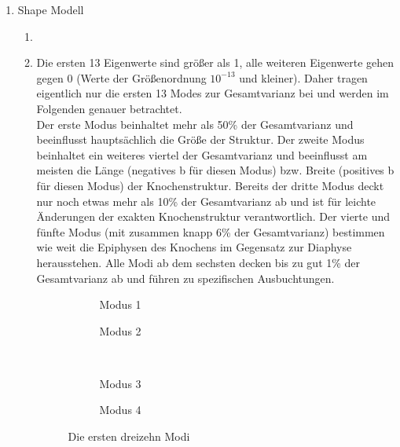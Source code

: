 \documentclass[]{report}
\newlength\figureheight
\newlength\figurewidth
\begin{document}
\begin{enumerate}
	\item Shape Modell
	\begin{enumerate}
		\item
		\item %
		Die ersten 13 Eigenwerte sind größer als 1, alle weiteren Eigenwerte gehen gegen 0 (Werte der Größenordnung $10^{-13}$ und kleiner). Daher tragen eigentlich nur die ersten 13 Modes zur Gesamtvarianz bei und werden im Folgenden genauer betrachtet.\\
		Der erste Modus beinhaltet mehr als 50\% der Gesamtvarianz und beeinflusst hauptsächlich die Größe der Struktur.
		Der zweite Modus beinhaltet ein weiteres viertel der Gesamtvarianz und beeinflusst am meisten die Länge (negatives b für diesen Modus) bzw. Breite (positives b für diesen Modus) der Knochenstruktur.
		Bereits der dritte Modus deckt nur noch etwas mehr als 10\% der Gesamtvarianz ab und ist für leichte Änderungen der exakten Knochenstruktur verantwortlich.
		Der vierte und fünfte Modus (mit zusammen knapp 6\% der Gesamtvarianz) bestimmen wie weit die Epiphysen des Knochens im Gegensatz zur Diaphyse herausstehen.
		Alle Modi ab dem sechsten decken bis zu gut 1\% der Gesamtvarianz ab und führen zu spezifischen Ausbuchtungen.
		\setlength\figureheight{5cm}
		\setlength{}
		\begin{figure}[tbp!]
			\begin{subfigure}{0.45\textwidth}
				\centering
				
				\caption{Modus 1}
				\label{fig:mode1}
			\end{subfigure}
			\qquad
			\begin{subfigure}{0.45\textwidth}
				\centering
				
				\caption{Modus 2}
				\label{fig:mode2}
			\end{subfigure}	
			\\
			\begin{subfigure}{0.45\textwidth}
				\centering
				
				\caption{Modus 3}
				\label{fig:mode3}
			\end{subfigure}
			\qquad
			\begin{subfigure}{0.45\textwidth}
				\centering
				
				\caption{Modus 4}
				\label{fig:mode4}
			\end{subfigure}	
			\caption{Die ersten dreizehn Modi}
			\label{fig:modi}
		\end{figure}
		

\end{enumerate}
\end{enumerate}
\end{document}
